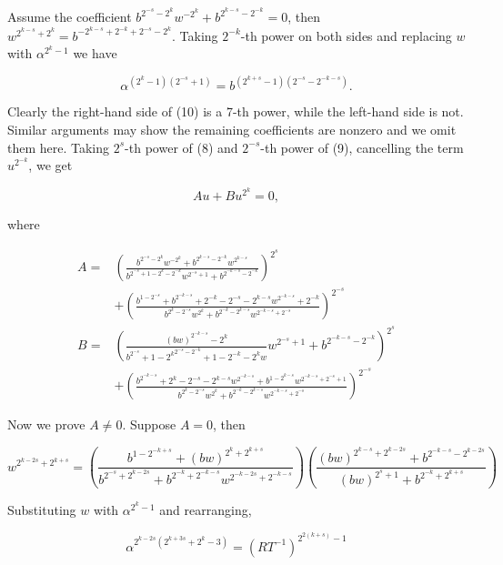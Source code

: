 \documentclass[10pt]{article}
\begin{document}
Assume the coefficient $b^{2^{-s}-2^{k}} w^{-2^{k}}+b^{2^{k-s}-2^{-k}}=0$, then $w^{2^{k-s}+2^{k}}=b^{-2^{k-s}+2^{-k}+2^{-s}-2^{k}}$. Taking $2^{-k}$-th power on both sides and replacing $w$ with $\alpha^{2^{k}-1}$ we have


\begin{equation*}
\alpha^{\left(2^{k}-1\right)\left(2^{-s}+1\right)}=b^{\left(2^{k+s}-1\right)\left(2^{-s}-2^{-k-s}\right)} . \tag{10}
\end{equation*}


Clearly the right-hand side of (10) is a 7-th power, while the left-hand side is not. Similar arguments may show the remaining coefficients are nonzero and we omit them here. Taking $2^{s}$-th power of (8) and $2^{-s}$-th power of (9), cancelling the term $u^{2^{-k}}$, we get


\begin{equation*}
A u+B u^{2^{k}}=0, \tag{11}
\end{equation*}


where

$$
\begin{aligned}
A= & \left(\frac{b^{2^{-s}-2^{k}} w^{-2^{k}}+b^{2^{k-s}-2^{-k}} w^{2^{k-s}}}{b^{2^{-s}+1-2^{k}-2^{-k}} w^{2^{-s}+1}+b^{2^{-k-s}-2^{-k}}}\right)^{2^{s}} \\
& +\left(\frac{b^{1-2^{-s}}+b^{2^{-k-s}}+2^{-k}-2^{-s}-2^{k-s} w^{2^{-k-s}}+2^{-k}}{b^{2^{k}-2^{-s}} w^{2^{k}}+b^{2^{-k}-2^{k-s}} w^{2^{-k-s}+2^{-s}}}\right)^{2^{-s}} \\
B= & \left(\frac{(b w)^{2^{-k-s}}-2^{k}}{b^{2^{-s}}+1-{2^{k}}^{2^{-s}-2^{-k}}+1-2^{-k}-2^{k} w} w^{2^{-s}+1}+b^{2^{-k-s}-2^{-k}}\right)^{2^{s}} \\
& +\left(\frac{b^{2^{-k-s}}+2^{k}-2^{-s}-2^{k-s} w^{2^{-k-s}}+b^{1-2^{k-s}} w^{2^{-k-s}+2^{-s}+1}}{b^{2^{k}-2^{-s}} w^{2^{k}}+b^{2^{-k}-2^{k-s}} w^{2^{-k-s}+2^{-s}}}\right)^{2^{-s}}
\end{aligned}
$$

Now we prove $A \neq 0$. Suppose $A=0$, then

$$
w^{2^{k-2 s}+2^{k+s}}=\left(\frac{b^{1-2^{-k+s}}+(b w)^{2^{k}+2^{k+s}}}{b^{2^{-s}+2^{k-2 s}}+b^{2^{-k}+2^{-k-s}} w^{2^{-k-2 s}+2^{-k-s}}}\right)\left(\frac{(b w)^{2^{k-s}+2^{k-2 s}}+b^{2^{-k-s}-2^{k-2 s}}}{(b w)^{2^{s}+1}+b^{2^{-k}+2^{k+s}}}\right)
$$

Substituting $w$ with $\alpha^{2^{k}-1}$ and rearranging,


\begin{equation*}
\alpha^{2^{k-2 s}\left(2^{k+3 s}+2^{k}-3\right)}=\left(R T^{-1}\right)^{2^{2(k+s)}-1} \tag{12}
\end{equation*}
\end{document}

